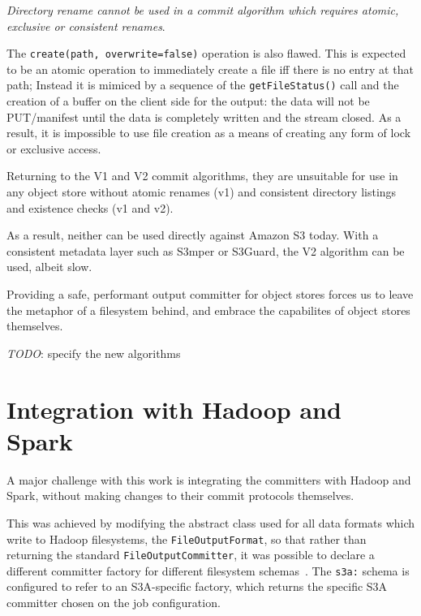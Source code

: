 \documentclass[conference]{IEEEtran}
\newcommand{\TODO}{\emph{TODO}}
\begin{document}
\emph{Directory rename cannot be used in a commit algorithm which
requires atomic, exclusive or consistent renames}.

The \texttt{create(path, overwrite=false)} operation is also flawed.
This is expected to be an atomic operation to immediately create a file iff there is
no entry at that path;
Instead it is mimiced by a sequence of the  \texttt{getFileStatus()} call
and the creation of a buffer on the client side for the output: the data
will not be PUT/manifest until the data is completely written and the stream
closed.
As a result, it is impossible to use file creation as a means of creating any
form of lock or exclusive access.


Returning to the V1 and V2 commit algorithms, they are unsuitable for
use in any object store without atomic renames (v1) and consistent
directory listings  and existence checks (v1 and v2).

As a result, neither can be used directly against Amazon S3 today.
With a consistent metadata layer such as S3mper or S3Guard, the V2 algorithm
can be used, albeit slow.

Providing a safe, performant output committer for object stores forces
us to leave the metaphor of a filesystem behind, and embrace
the capabilites of object stores themselves.



\TODO: specify the new algorithms




\section{Integration with Hadoop and Spark}
\label{sec:integration}

A major challenge with this work is integrating the committers with Hadoop
and Spark, without making changes to their commit protocols themselves.

This was achieved by modifying the abstract class used for all data formats
which write to Hadoop filesystems, the \texttt{FileOutputFormat}, so that rather than
returning the standard \texttt{FileOutputCommitter}, it was possible to declare
a different committer factory for different filesystem schemas\ \cite{MAPREDUCE-6823}.
The \texttt{s3a:} schema is configured to refer to an S3A-specific factory, which
returns the specific S3A committer chosen on the job configuration.
\end{document}
